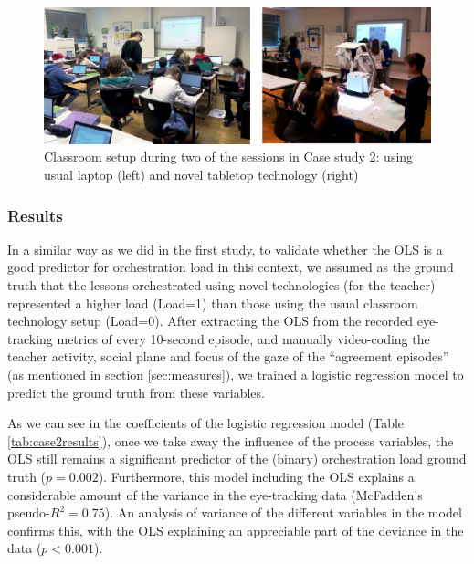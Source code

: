 \documentclass[10pt,journal,compsoc]{IEEEtran}
\begin{document}
\begin{figure}[!t]
\centering
\includegraphics[width=\linewidth]{img/Case2Picture}
\caption{Classroom setup during two of the sessions in Case study 2: using usual laptop (left) and novel tabletop technology (right)}
\label{fig:case2picture}
\end{figure}

\subsubsection{Results}

In a similar way as we did in the first study, to validate whether the OLS is a good predictor for orchestration load in this context, we assumed as the ground truth that the lessons orchestrated using novel technologies (for the teacher) represented a higher load (Load=1) than those using the usual classroom technology setup (Load=0). After extracting the OLS from the recorded eye-tracking metrics of every 10-second episode, and manually video-coding the teacher activity, social plane and focus of the gaze of the ``agreement episodes'' (as mentioned in section \ref{sec:measures}), we trained a logistic regression model to predict the ground truth from these variables.

As we can see in the coefficients of the logistic regression model (Table \ref{tab:case2results}), once we take away the influence of the process variables, the OLS still remains a significant predictor of the (binary) orchestration load ground truth ($p=0.002$). Furthermore, this model including the OLS explains a considerable amount of the variance in the eye-tracking data (McFadden's pseudo-$R^2=0.75$). An analysis of variance of the different variables in the model confirms this, with the OLS explaining an appreciable part of the deviance in the data ($p<0.001$). 
\end{document}
